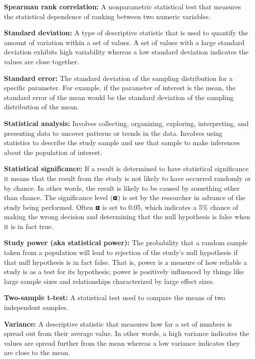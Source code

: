 \documentclass[
]{book}
\begin{document}
\textbf{Spearman rank correlation:} A nonparametric statistical test that measures the statistical dependence of ranking between two numeric variables.

\textbf{Standard deviation:} A type of descriptive statistic that is used to quantify the amount of variation within a set of values. A set of values with a large standard deviation exhibits high variability whereas a low standard deviation indicates the values are close together.

\textbf{Standard error:} The standard deviation of the sampling distribution for a specific parameter. For example, if the parameter of interest is the mean, the standard error of the mean would be the standard deviation of the sampling distribution of the mean.

\textbf{Statistical analysis:} Involves collecting, organizing, exploring, interpreting, and presenting data to uncover patterns or trends in the data. Involves using statistics to describe the study sample and use that sample to make inferences about the population of interest.

\textbf{Statistical significance:} If a result is determined to have statistical significance it means that the result from the study is not likely to have occurred randomly or by chance. In other words, the result is likely to be caused by something other than chance. The significance level (𝝰) is set by the researcher in advance of the study being performed. Often 𝝰 is set to 0.05, which indicates a 5\% chance of making the wrong decision and determining that the null hypothesis is false when it is in fact true.

\textbf{Study power (aka statistical power):} The probability that a random sample taken from a population will lead to rejection of the study's null hypothesis if that null hypothesis is in fact false. That is, power is a measure of how reliable a study is as a test for its hypothesis; power is positively influenced by things like large sample sizes and relationships characterized by large effect sizes.

\textbf{Two-sample t-test:} A statistical test used to compare the means of two independent samples.

\textbf{Variance:} A descriptive statistic that measures how far a set of numbers is spread out from their average value. In other words, a high variance indicates the values are spread further from the mean whereas a low variance indicates they are close to the mean.
\end{document}
